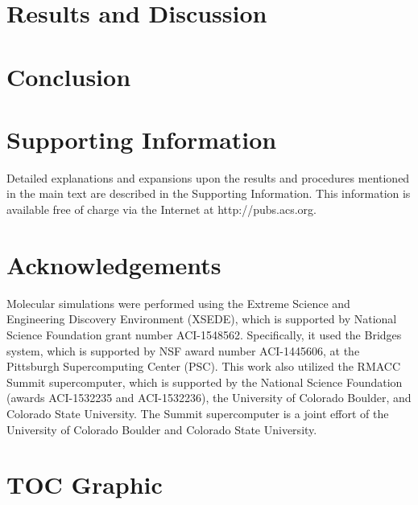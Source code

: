 \documentclass{article}
\begin{document}
  \section{Results and Discussion}

  \section{Conclusion}
 
  \section*{Supporting Information}

  Detailed explanations and expansions upon the results and procedures mentioned in
  the main text are described in the Supporting Information. This information is
  available free of charge via the Internet at http://pubs.acs.org.

  \section*{Acknowledgements}

  Molecular simulations were performed using the Extreme Science and
  Engineering Discovery Environment (XSEDE), which is supported by National
  Science Foundation grant number ACI-1548562. Specifically, it used the Bridges
  system, which is supported by NSF award number ACI-1445606, at the Pittsburgh
  Supercomputing Center (PSC). This work also utilized the RMACC Summit supercomputer,
  which is supported by the National Science Foundation (awards ACI-1532235 and
  ACI-1532236), the University of Colorado Boulder, and Colorado State
  University. The Summit supercomputer is a joint effort of the University of
  Colorado Boulder and Colorado State University.

  \clearpage

  
  

  \newpage

  \section*{TOC Graphic}
\end{document}
